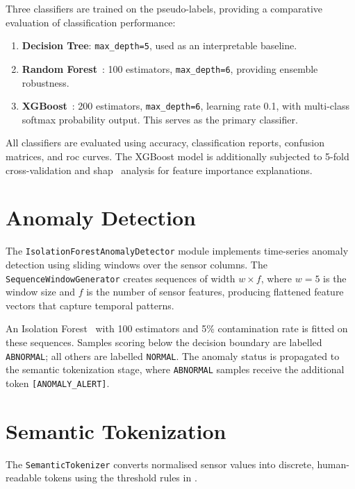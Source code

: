 \documentclass[12pt,a4paper,oneside]{report}
\begin{document}
Three classifiers are trained on the pseudo-labels, providing a comparative evaluation of classification performance:

\begin{enumerate}
    \item \textbf{Decision Tree}: \texttt{max\_depth=5}, used as an interpretable baseline.
    \item \textbf{Random Forest}~\cite{chen2016xgboost}: 100 estimators, \texttt{max\_depth=6}, providing ensemble robustness.
    \item \textbf{XGBoost}~\cite{chen2016xgboost}: 200 estimators, \texttt{max\_depth=6}, learning rate 0.1, with multi-class softmax probability output. This serves as the primary classifier.
\end{enumerate}

All classifiers are evaluated using accuracy, classification reports, confusion matrices, and \gls{roc} curves. The XGBoost model is additionally subjected to 5-fold cross-validation and \gls{shap}~\cite{lundberg2017shap} analysis for feature importance explanations.


\section{Anomaly Detection}
\label{sec:impl-anomaly}

The \texttt{IsolationForestAnomalyDetector} module implements time-series anomaly detection using sliding windows over the sensor columns. The \texttt{SequenceWindowGenerator} creates sequences of width $w \times f$, where $w=5$ is the window size and $f$ is the number of sensor features, producing flattened feature vectors that capture temporal patterns.

An Isolation Forest~\cite{liu2008isolation} with 100 estimators and 5\% contamination rate is fitted on these sequences. Samples scoring below the decision boundary are labelled \texttt{ABNORMAL}; all others are labelled \texttt{NORMAL}. The anomaly status is propagated to the semantic tokenization stage, where \texttt{ABNORMAL} samples receive the additional token \texttt{[ANOMALY\_ALERT]}.


\section{Semantic Tokenization}
\label{sec:impl-tokenization}

The \texttt{SemanticTokenizer} converts normalised sensor values into discrete, human-readable tokens using the threshold rules in .
\end{document}
